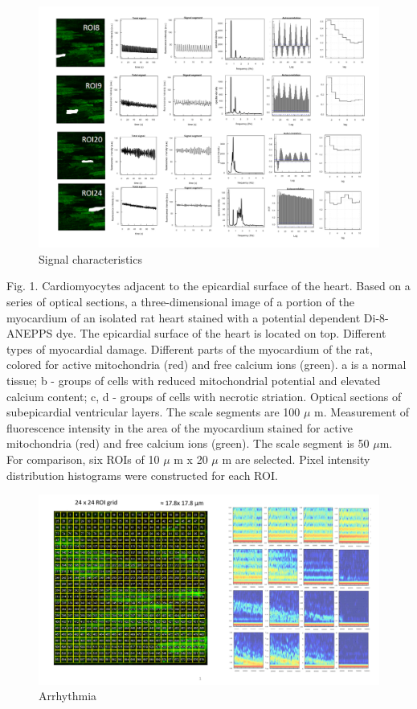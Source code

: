 \documentclass[a4paper,12pt]{article}
\begin{document}
\begin{figure}
    \includegraphics[width=\linewidth]{fig4.png}
    \caption{Signal characteristics}
    \label{fig:fig4}
\end{figure}

Fig. 1. Cardiomyocytes adjacent to the epicardial surface of the heart. Based on a series of optical sections, a three-dimensional image of a portion of the myocardium of an isolated rat heart stained with a potential dependent Di-8-ANEPPS dye. The epicardial surface of the heart is located on top. Different types of myocardial damage. Different parts of the myocardium of the rat, colored for active mitochondria (red) and free calcium ions (green). a is a normal tissue; b - groups of cells with reduced mitochondrial potential and elevated calcium content; c, d - groups of cells with necrotic striation. Optical sections of subepicardial ventricular layers. The scale segments are 100 $\mu$ m. Measurement of fluorescence intensity in the area of the myocardium stained for active mitochondria (red) and free calcium ions (green). The scale segment is 50 $\mu$m. For comparison, six ROIs of 10 $\mu$ m x 20 $\mu$ m are selected. Pixel intensity distribution histograms were constructed for each ROI.

\begin{figure}
    \includegraphics[width=\linewidth]{fig5.png}
    \caption{Arrhythmia}
    \label{fig:fig5}
\end{figure}
\end{document}
